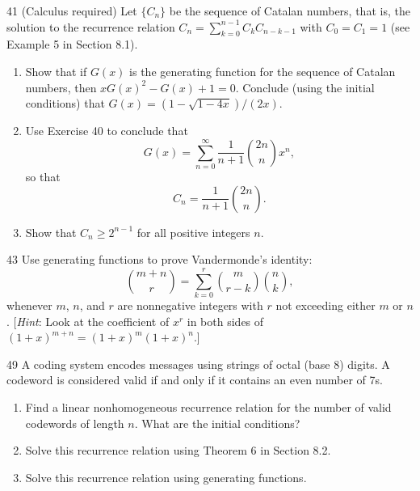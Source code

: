 \documentclass[11pt]{article}
\begin{document}
\begin{exercise}{41}
    (Calculus required) Let $\{C_n\}$ be the sequence of Catalan
    numbers, that is, the solution to the recurrence relation
    $C_n = \sum_{k=0}^{n-1} C_k C_{n-k-1}$ with $C_0 = C_1 = 1$ (see
    Example 5 in Section 8.1).
    \begin{enumerate}[label=(\alph*)]
        \item Show that if $G(x)$ is the generating function for the
        sequence of Catalan numbers, then $xG(x)^2 - G(x) + 1 = 0$.
        Conclude (using the initial conditions) that
        $G(x) = (1 - \sqrt{1-4x})/(2x)$.
        \item Use Exercise 40 to conclude that
        \[
        G(x) = \sum_{n=0}^{\infty} \frac{1}{n+1} \binom{2n}{n} x^n,
        \]
        so that
        \[
        C_n = \frac{1}{n+1} \binom{2n}{n}.
        \]
        \item Show that $C_n \geq 2^{n-1}$ for all positive integers
        $n$.
    \end{enumerate}
\end{exercise}

\begin{exercise}{43}
    Use generating functions to prove Vandermonde's identity:
    \[
    \binom{m+n}{r} = \sum_{k=0}^{r} \binom{m}{r-k} \binom{n}{k},
    \]
    whenever $m$, $n$, and $r$ are nonnegative integers with $r$ not
    exceeding either $m$ or $n$.
    [\emph{Hint}: Look at the coefficient of $x^r$ in both sides of
    $(1+x)^{m+n} = (1+x)^m (1+x)^n$.]
\end{exercise}

\begin{exercise}{49}
    A coding system encodes messages using strings of octal (base 8)
    digits. A codeword is considered valid if and only if it contains
    an even number of 7s.
    \begin{enumerate}[label=(\alph*)]
        \item Find a linear nonhomogeneous recurrence relation for
        the number of valid codewords of length $n$. What are the
        initial conditions?
        \item Solve this recurrence relation using Theorem 6 in
        Section 8.2.
        \item Solve this recurrence relation using generating
        functions.
    \end{enumerate}
\end{exercise}
\end{document}
